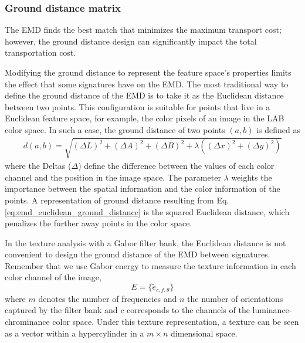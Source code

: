 \subsubsection{Ground distance matrix}
The EMD finds the best match that minimizes the maximum transport cost; however, the ground distance design can significantly impact the total transportation cost.

Modifying the ground distance to represent the feature space's properties limits the effect that some signatures have on the EMD. The most traditional way to define the ground distance of the EMD is to take it as the Euclidean distance between two points. This configuration is suitable for points that live in a Euclidean feature space, for example, the color pixels of an image in the LAB color space. In such a case, the ground distance of two points $(a,b)$ is defined as
\begin{eqnarray} \label{eq:emd_euclidean_ground_distance}
	d(a, b) = \sqrt{(\Delta L)^2 + (\Delta A)^2 + (\Delta B)^2 + \lambda((\Delta x)^2 +(\Delta y)^2) } 	
\end{eqnarray}
where the Deltas ($\Delta$) define the difference between the values of each color channel and the position in the image space. The parameter $\lambda$ weights the importance between the spatial information and the color information of the points. A representation of ground distance resulting from Eq. \eqref{eq:emd_euclidean_ground_distance} is the squared Euclidean distance, which penalizes the further away points in the color space.

In the texture analysis with a Gabor filter bank, the Euclidean distance is not convenient to design the ground distance of the EMD between signatures. Remember that we use Gabor energy to measure the texture information in each color channel of the image,
\begin{equation}\label{eq:feature_space}
	E = \{\widetilde{e}_{c, f, \theta}\}
\end{equation}
where $m$ denotes the number of frequencies and $n$ the number of orientations captured by the filter bank and $c$ corresponds to the channels of the luminance-chrominance color space. Under this texture representation, a texture can be seen as a vector within a hypercylinder in a $m \times n$ dimensional space.


